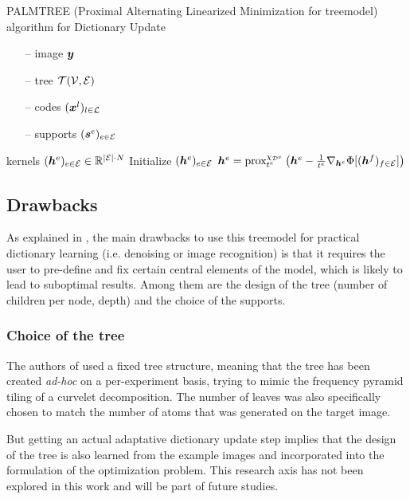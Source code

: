 \begin{algorithm}[!ht]
    \caption{\ac{PALMTREE} (Proximal Alternating Linearized Minimization for \Gls{treemodel}) algorithm for Dictionary Update}\label{alg_palmtree}
  \begin{algorithmic}[1]
    \Input
    \begin{itemize}
    	\item[--] image $\bm{y}$
    	\item[--] tree $\mathcal T(\mathcal V,\mathcal E)$
    	\item[--] codes $(\bm{x}^l)_{l \in \mathcal L}$
    	\item[--] supports $(\bm{s}^e)_{e \in \mathcal E}$
    \end{itemize}
    \Output kernels $(\bm{h}^e)_{e \in \mathcal E} \in \mathbb{R}^{|\mathcal E| \cdot N}$
    \State Initialize $(\bm{h}^e)_{e \in \mathcal E}$
      	\State $\bm{h}^e = \text{prox}^{\chi_{{\mathcal D}^e}}_{t^e} \left(\bm{h}^e-\frac{1}{t^e} \nabla_{\bm{h}^e} \Phi[(\bm{h}^f)_{f \in \mathcal E}] \right)$
      \EndFor
    \EndWhile
  \end{algorithmic}
\end{algorithm}



\subsection{Drawbacks}
As explained in \cite[p. 23]{chabiron_optimization_2016}, the main drawbacks to use this \gls{treemodel} for practical dictionary learning (i.e. denoising or image recognition) is that it requires the user to pre-define and fix certain central elements of the model, which is likely to lead to suboptimal results. Among them are the design of the tree (number of children per node, depth) and the choice of the supports.
\subsubsection{Choice of the tree}
The authors of \cite{chabiron_optimization_2016} used a fixed tree structure, meaning that the tree has been created \emph{ad-hoc} on a per-experiment basis, trying to mimic the frequency pyramid tiling of a curvelet decomposition. The number of leaves was also specifically chosen to match the number of atoms that was generated on the target image.

But getting an actual adaptative dictionary update step implies that the design of the tree is also learned from the example images and incorporated into the formulation of the optimization problem. This research axis has not been explored in this work and will be part of future studies.

